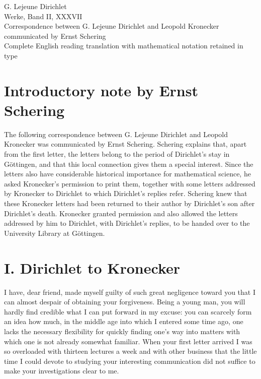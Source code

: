 \documentclass[11pt]{article}
\begin{document}
\begin{center}
{\Large G. Lejeune Dirichlet}\\[0.3em]
{\large Werke, Band II, XXXVII}\\[0.8em]
{\LARGE Correspondence between G. Lejeune Dirichlet and Leopold Kronecker}\\[0.4em]
{\large communicated by Ernst Schering}\\[0.7em]
{\small Complete English reading translation with mathematical notation retained in type}
\end{center}

\section*{Introductory note by Ernst Schering}
The following correspondence between G. Lejeune Dirichlet and Leopold Kronecker was communicated by Ernst Schering. Schering explains that, apart from the first letter, the letters belong to the period of Dirichlet's stay in Göttingen, and that this local connection gives them a special interest. Since the letters also have considerable historical importance for mathematical science, he asked Kronecker's permission to print them, together with some letters addressed by Kronecker to Dirichlet to which Dirichlet's replies refer. Schering knew that these Kronecker letters had been returned to their author by Dirichlet's son after Dirichlet's death. Kronecker granted permission and also allowed the letters addressed by him to Dirichlet, with Dirichlet's replies, to be handed over to the University Library at Göttingen.

\section*{I. Dirichlet to Kronecker}
I have, dear friend, made myself guilty of such great negligence toward you that I can almost despair of obtaining your forgiveness. Being a young man, you will hardly find credible what I can put forward in my excuse: you can scarcely form an idea how much, in the middle age into which I entered some time ago, one lacks the necessary flexibility for quickly finding one's way into matters with which one is not already somewhat familiar. When your first letter arrived I was so overloaded with thirteen lectures a week and with other business that the little time I could devote to studying your interesting communication did not suffice to make your investigations clear to me.
\end{document}
